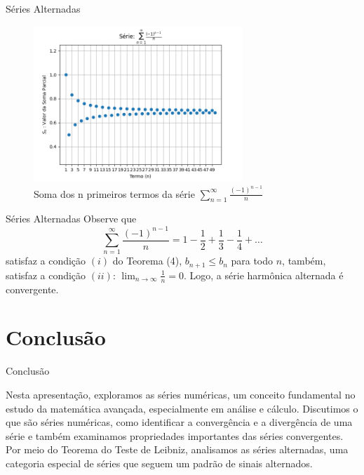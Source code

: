 \documentclass[brazil]{beamer}
\begin{document}
	\begin{frame}{Séries Alternadas}
		\begin{figure}
			\centering
			\includegraphics[width=0.7\textwidth]{../images/serie_4.png}
			\caption{Soma dos n primeiros termos da série  $\displaystyle\sum_{n=1}^{\infty} \frac{(-1)^{n-1}}{n}$}
		\end{figure}
	\end{frame}
	
	\begin{frame}{Séries Alternadas}
		Observe que $$\displaystyle\sum_{n=1}^{\infty} \frac{(-1)^{n-1}}{n} = 1 - \frac{1}{2} + \frac{1}{3} - \frac{1}{4} + \dots$$
		satisfaz a condição $(i)$ do Teorema (4), $b_{n + 1} \leq b_n$ para todo $n$, também, satisfaz a condição $(ii)$: $\displaystyle\lim_{n \to \infty} \frac{1}{n} = 0$. Logo, a série harmônica alternada é convergente.
	\end{frame}
	
	\section{Conclusão}
	\begin{frame}
		\tableofcontents[currentsection]
	\end{frame}
	
	\begin{frame}{Conclusão}
		
		\justifying
		Nesta apresentação, exploramos as séries numéricas, um conceito fundamental no estudo da matemática avançada, especialmente em análise e cálculo. Discutimos o que são séries numéricas, como identificar a convergência e a divergência de uma série e também examinamos propriedades importantes das séries convergentes. Por meio do Teorema do Teste de Leibniz, analisamos as séries alternadas, uma categoria especial de séries que seguem um padrão de sinais alternados.
		
	\end{frame}
	
\end{document}
